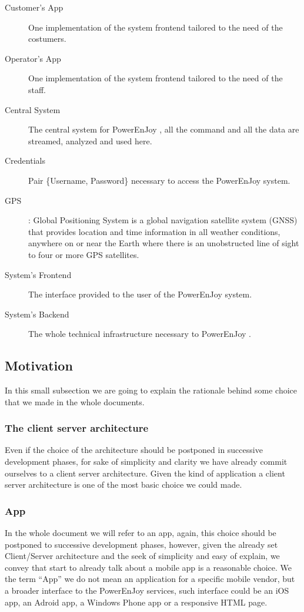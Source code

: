 \documentclass[11pt]{article} %
\newcommand{\pe}{PowerEnJoy }
\begin{document}
\begin{description}
	\item[Customer's App] One implementation of the system frontend tailored to the need of the costumers.
	\item[Operator's App] One implementation of the system frontend tailored to the need of the staff.
	\item[Central System] The central system for \pe, all the command and all the data are streamed, analyzed and used here.
	\item[Credentials] Pair \{Username, Password\} necessary to access the \pe system.
  	\item[GPS]: Global Positioning System is a global navigation satellite system (GNSS) that provides location and time information in all weather conditions, anywhere on or near the Earth where there is an unobstructed line of sight to four or more GPS satellites.
  	\item[System's Frontend] The interface provided to the user of the \pe system. 
  	\item[System's Backend]  The whole technical infrastructure necessary to \pe.
  \end{description}

\subsection{Motivation}

In this small subsection we are going to explain the rationale behind some choice that we made in the whole documents.

\subsubsection{The client server architecture}

Even if the choice of the architecture should be postponed in successive development phases, for sake of simplicity and clarity we have already commit ourselves to a client server architecture.
Given the kind of application a client server architecture is one of the most basic choice we could made.

\subsubsection{App}

In the whole document we will refer to an app, again, this choice should be postponed to successive development phases, however, given the already set Client/Server architecture and the seek of simplicity and easy of explain, we convey that start to already talk about a mobile app is a reasonable choice.
We the term ``App'' we do not mean an application for a specific mobile vendor, but a broader interface to the \pe services, such interface could be an iOS app, an Adroid app, a Windows Phone app or a responsive HTML page.
\end{document}
